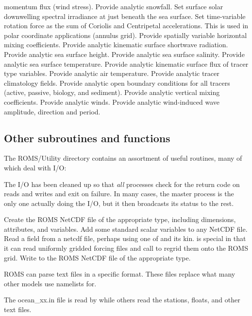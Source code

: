 \begin{klist}
   momentum flux (wind stress).
       Provide analytic snowfall.
       Set surface solar downwelling spectral
     irradiance at just beneath the sea surface.
       Set time-variable rotation force as the
   sum of Coriolis and Centripetal accelerations.  This is used in polar
   coordinate applications (annulus grid).
      Provide spatially variable horizontal mixing
   coefficients.
       Provide analytic kinematic surface
   shortwave radiation.
       Provide analytic sea surface height.
       Provide analytic sea surface salinity.
       Provide analytic sea surface temperature.
       Provide analytic kinematic surface
   flux of tracer type variables.
       Provide analytic air temperature.
       Provide analytic tracer climatology fields.
       Provide analytic open boundary conditions for
   all tracers (active, passive, biology, and sediment).
       Provide analytic vertical mixing coefficients.
       Provide analytic winds.
       Provide analytic wind-induced wave amplitude,
     direction and period.
   \end{klist}

\subsection{Other subroutines and functions}
\label{Minor}
The ROMS/Utility directory contains an assortment of useful
routines, many of which deal with I/O:
\begin{klist}
 The I/O has been cleaned up so that {\em all}
processes check for the return code on reads and writes and exit on
failure. In many cases, the master process is the only one actually
doing the I/O, but it then broadcasts its status to the rest.
   \begin{klist}
      Create the ROMS NetCDF file of the appropriate
   type, including dimensions, attributes, and variables.
      Add some standard scalar variables to any NetCDF file.
      Read a field from a netcdf file, perhaps
     using one of  and its kin. 
     is special in that it can read uniformly gridded forcing files
     and call  to regrid them onto the ROMS grid.
      Write to the ROMS NetCDF file of the appropriate type.
   \end{klist}
 ROMS can parse text files in a specific format.
These files replace what many other models use namelists for.
  \begin{klist}
     The ocean\_xx.in file is read by 
    while others read the stations, floats, and other text files.
  \end{klist}
\end{klist}


